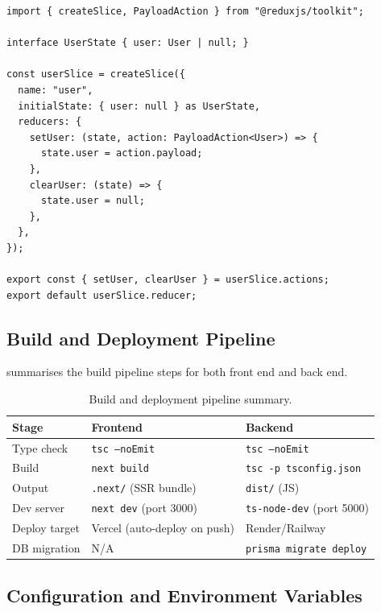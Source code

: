 \begin{lstlisting}[caption={Redux user slice.}, label=lst:redux]
import { createSlice, PayloadAction } from "@reduxjs/toolkit";

interface UserState { user: User | null; }

const userSlice = createSlice({
  name: "user",
  initialState: { user: null } as UserState,
  reducers: {
    setUser: (state, action: PayloadAction<User>) => {
      state.user = action.payload;
    },
    clearUser: (state) => {
      state.user = null;
    },
  },
});

export const { setUser, clearUser } = userSlice.actions;
export default userSlice.reducer;
\end{lstlisting}

\subsection{Build and Deployment Pipeline}

 summarises the build pipeline steps for both
front end and back end.

\begin{table}[H]
  \centering
  \caption{Build and deployment pipeline summary.}
  \label{tab:buildpipeline}
  \begin{tabular}{lll}
    \toprule
    \textbf{Stage}     & \textbf{Frontend}           & \textbf{Backend} \\
    \midrule
    Type check         & \texttt{tsc --noEmit}       & \texttt{tsc --noEmit} \\
    Build              & \texttt{next build}         & \texttt{tsc -p tsconfig.json} \\
    Output             & \texttt{.next/} (SSR bundle) & \texttt{dist/} (JS) \\
    Dev server         & \texttt{next dev} (port 3000)& \texttt{ts-node-dev} (port 5000) \\
    Deploy target      & Vercel (auto-deploy on push) & Render/Railway \\
    DB migration       & N/A                         & \texttt{prisma migrate deploy} \\
    \bottomrule
  \end{tabular}
\end{table}

\subsection{Configuration and Environment Variables}

